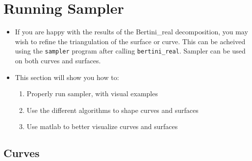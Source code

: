 

\section{Running Sampler}


 \begin{itemize}
  \item If you are happy with the results of the Bertini\_real decomposition, you may wish to refine the triangulation of the surface or curve. This can be acheived using the \texttt{sampler} program after calling \texttt{bertini\_real}. Sampler can be used on both curves and surfaces. 
  \item This section will show you how to:
   \begin{enumerate}
   	\item Properly run sampler, with visual examples
   	\item Use the different algorithms to shape curves and surfaces
   	\item Use matlab to better visualize curves and surfaces
   \end{enumerate}
 \end{itemize}  

 \subsection{Curves}
 \label{sec:sampler_curve}

